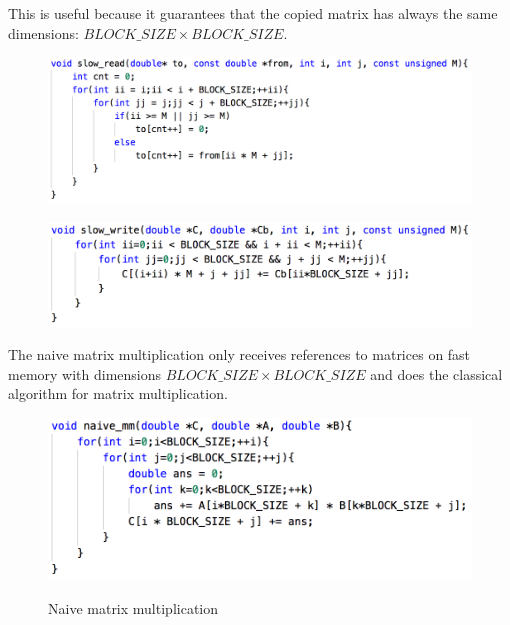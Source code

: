 \documentclass[unicode,11pt,a4paper,oneside,numbers=endperiod,openany]{scrartcl}
\begin{document}
\begin{enumerate}
            This is useful because it guarantees that the copied matrix has always the same dimensions: $BLOCK\_SIZE \times BLOCK\_SIZE$.

            \begin{figure}[H]
                \begin{minipage}{.48\textwidth}
                    \centering
                    \includegraphics[width=\linewidth]{load}
                    \label{load}
                \end{minipage}%
                \hfill
                \begin{minipage}{.48\textwidth}
                    \centering
                    \includegraphics[width=\linewidth]{write}
                    \label{write}
                \end{minipage}
            \end{figure}

        The naive matrix multiplication only receives references to matrices on fast memory with dimensions $BLOCK\_SIZE \times BLOCK\_SIZE$ and does the classical algorithm for matrix multiplication.

            \begin{figure}[H]
                \includegraphics[width=\linewidth]{naive}
                \label{naive}
                \caption{Naive matrix multiplication}
            \end{figure}


\end{enumerate}
\end{document}
